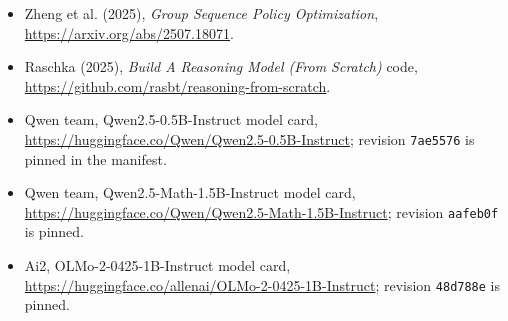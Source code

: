 \documentclass[11pt]{article}
\begin{document}
\begin{itemize}
\item Zheng et al. (2025), \emph{Group Sequence Policy Optimization}, \url{https://arxiv.org/abs/2507.18071}.
\item Raschka (2025), \emph{Build A Reasoning Model (From Scratch)} code, \url{https://github.com/rasbt/reasoning-from-scratch}.
\item Qwen team, Qwen2.5-0.5B-Instruct model card, \url{https://huggingface.co/Qwen/Qwen2.5-0.5B-Instruct}; revision \texttt{7ae5576} is pinned in the manifest.
\item Qwen team, Qwen2.5-Math-1.5B-Instruct model card, \url{https://huggingface.co/Qwen/Qwen2.5-Math-1.5B-Instruct}; revision \texttt{aafeb0f} is pinned.
\item Ai2, OLMo-2-0425-1B-Instruct model card, \url{https://huggingface.co/allenai/OLMo-2-0425-1B-Instruct}; revision \texttt{48d788e} is pinned.
\end{itemize}
\end{document}
